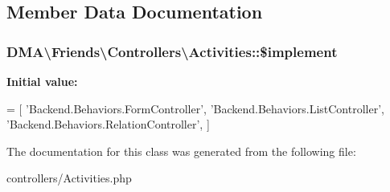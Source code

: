 \subsection{Member Data Documentation}
\hypertarget{classDMA_1_1Friends_1_1Controllers_1_1Activities_aff57941f0ab53e417ce578994badc87f}{
\subsubsection[{\$implement}]{\setlength{\rightskip}{0pt plus 5cm}D\-M\-A\textbackslash{}\-Friends\textbackslash{}\-Controllers\textbackslash{}\-Activities\-::\$implement}}\label{classDMA_1_1Friends_1_1Controllers_1_1Activities_aff57941f0ab53e417ce578994badc87f}
{\bfseries Initial value\-:}
\begin{DoxyCode}
= [
        \textcolor{stringliteral}{'Backend.Behaviors.FormController'},
        \textcolor{stringliteral}{'Backend.Behaviors.ListController'},
        \textcolor{stringliteral}{'Backend.Behaviors.RelationController'},
    ]
\end{DoxyCode}


The documentation for this class was generated from the following file\-:\begin{DoxyCompactItemize}
\item 
controllers/Activities.\-php\end{DoxyCompactItemize}
